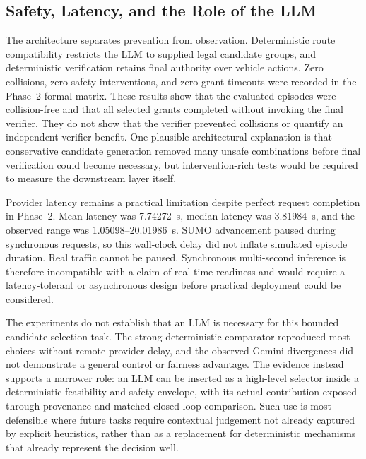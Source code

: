 \documentclass[letterpaper,10pt,conference]{ieeeconf}
\begin{document}
\subsection{Safety, Latency, and the Role of the LLM}



The architecture separates prevention from observation. Deterministic route compatibility restricts the LLM to supplied legal candidate groups, and deterministic verification retains final authority over vehicle actions. Zero collisions, zero safety interventions, and zero grant timeouts were recorded in the Phase~2 formal matrix. These results show that the evaluated episodes were collision-free and that all selected grants completed without invoking the final verifier. They do not show that the verifier prevented collisions or quantify an independent verifier benefit. One plausible architectural explanation is that conservative candidate generation removed many unsafe combinations before final verification could become necessary, but intervention-rich tests would be required to measure the downstream layer itself.



Provider latency remains a practical limitation despite perfect request completion in Phase~2. Mean latency was 7.74272~s, median latency was 3.81984~s, and the observed range was 1.05098--20.01986~s. SUMO advancement paused during synchronous requests, so this wall-clock delay did not inflate simulated episode duration. Real traffic cannot be paused. Synchronous multi-second inference is therefore incompatible with a claim of real-time readiness and would require a latency-tolerant or asynchronous design before practical deployment could be considered.



The experiments do not establish that an LLM is necessary for this bounded candidate-selection task. The strong deterministic comparator reproduced most choices without remote-provider delay, and the observed Gemini divergences did not demonstrate a general control or fairness advantage. The evidence instead supports a narrower role: an LLM can be inserted as a high-level selector inside a deterministic feasibility and safety envelope, with its actual contribution exposed through provenance and matched closed-loop comparison. Such use is most defensible where future tasks require contextual judgement not already captured by explicit heuristics, rather than as a replacement for deterministic mechanisms that already represent the decision well.
\end{document}
